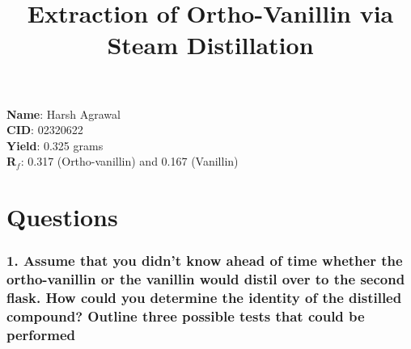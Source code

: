\documentclass[letterpaper,12pt]{article}
\begin{document}
\title{\vspace{-2em}Extraction of Ortho-Vanillin via Steam Distillation}
\date{}
\maketitle
\vspace{-2em}

\begin{spacing}{1.5}
    \noindent \textbf{Name}: Harsh Agrawal\\
    \textbf{CID}: 02320622 \\
    \textbf{Yield}: 0.325 grams \\
    \textbf{R$_f$}: 0.317 (Ortho-vanillin) and 0.167 (Vanillin) \\
\end{spacing}

\section*{Questions}
\subsubsection*{1. Assume that you didn't know ahead of time whether the ortho-vanillin or the vanillin would distil over to the second flask. How could you determine the identity of the distilled compound? Outline three possible tests that could be performed}
\end{document}
